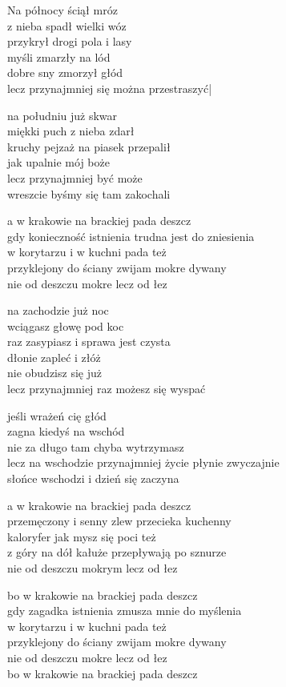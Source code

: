 \begin{text}
    \small{
    Na północy ściął mróz\\
    z nieba spadł wielki wóz\\
    przykrył drogi pola i lasy\\
    myśli zmarzły na lód\\
    dobre sny zmorzył głód\\
    lecz przynajmniej się można przestraszyć|

    na południu już skwar\\
    miękki puch z nieba zdarł\\
    kruchy pejzaż na piasek przepalił\\
    jak upalnie mój boże\\
    lecz przynajmniej być może\\
    wreszcie byśmy się tam zakochali

    a w krakowie na brackiej pada deszcz\\
    gdy konieczność istnienia trudna jest do zniesienia\\
    w korytarzu i w kuchni pada też\\
    przyklejony do ściany zwijam mokre dywany\\
    nie od deszczu mokre lecz od łez

    na zachodzie już noc\\
    wciągasz głowę pod koc\\
    raz zasypiasz i sprawa jest czysta\\
    dłonie zapleć i złóż\\
    nie obudzisz się już\\
    lecz przynajmniej raz możesz się wyspać

    jeśli wrażeń cię głód\\
    zagna kiedyś na wschód\\
    nie za długo tam chyba wytrzymasz\\
    lecz na wschodzie przynajmniej życie płynie zwyczajnie\\
    słońce wschodzi i dzień się zaczyna

    a w krakowie na brackiej pada deszcz\\
    przemęczony i senny zlew przecieka kuchenny\\
    kaloryfer jak mysz się poci też\\
    z góry na dół kałuże przepływają po sznurze\\
    nie od deszczu mokrym lecz od łez

    bo w krakowie na brackiej pada deszcz\\
    gdy zagadka istnienia zmusza mnie do myślenia\\
    w korytarzu i w kuchni pada też\\
    przyklejony do ściany zwijam mokre dywany\\
    nie od deszczu mokre lecz od łez\\
    bo w krakowie na brackiej pada deszcz
    }
\end{text}
